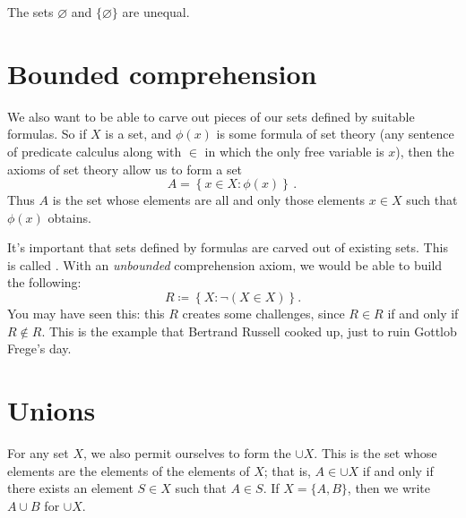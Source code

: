 \begin{exm}
	The sets $\varnothing$ and $\{\varnothing\}$ are unequal.
\end{exm}

\section{Bounded comprehension}%
\label{sec:bounded_comprehension}

We also want to be able to carve out pieces of our sets defined by suitable formulas.
So if $X$ is a set, and $\phi(x)$ is some formula of set theory (any sentence of predicate calculus along with $\in$ in which the only free variable is $x$), then the axioms of set theory allow us to form a set%
\[
	A = \left\{x\in X : \phi(x)\right\} \period
\]
Thus $A$ is the set whose elements are all and only those elements $x\in X$ such that $\phi(x)$ obtains.

\begin{exm}
	It's important that sets defined by formulas are carved out of existing sets.
	This is called .
	With an \emph{unbounded} comprehension axiom, we would be able to build the following:
	\[
		R\coloneq\left\{X : \neg(X\in X)\right\}.
	\]
	You may have seen this:
	this $R$ creates some challenges, since $R \in R $ if and only if $R \notin R $.
	This is the example that Bertrand Russell cooked up, just to ruin Gottlob Frege's day.
\end{exm}

\section{Unions}%
\label{sec:unions}

For any set $X$, we also permit ourselves to form the  $\cup X$.
This is the set whose elements are the elements of the elements of $X$;
that is, $A\in\cup X$ if and only if there exists an element $S\in X$ such that $A\in S$.
If $X=\{A,B\}$, then we write%
$A\cup B$ for $\cup X$.

